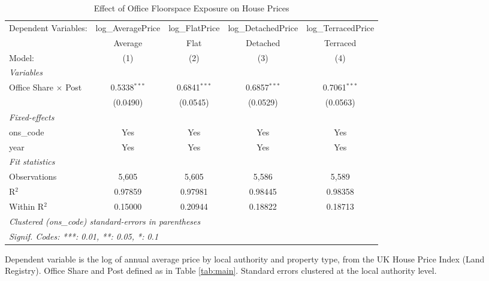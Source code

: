 
\begin{table}[htbp]
   \caption{\label{tab:prices} Effect of Office Floorspace Exposure on House Prices}
   \centering
   \footnotesize\begin{tabular}{lcccc}
      \tabularnewline \midrule \midrule
      Dependent Variables:        & log\_AveragePrice  & log\_FlatPrice  & log\_DetachedPrice  & log\_TerracedPrice\\   
                                  & Average            & Flat            & Detached            & Terraced \\   
      Model:                      & (1)                & (2)             & (3)                 & (4)\\  
      \midrule
      \emph{Variables}\\
      Office Share $\times$ Post  & 0.5338$^{***}$     & 0.6841$^{***}$  & 0.6857$^{***}$      & 0.7061$^{***}$\\   
                                  & (0.0490)           & (0.0545)        & (0.0529)            & (0.0563)\\   
      \midrule
      \emph{Fixed-effects}\\
      ons\_code                   & Yes                & Yes             & Yes                 & Yes\\  
      year                        & Yes                & Yes             & Yes                 & Yes\\  
      \midrule
      \emph{Fit statistics}\\
      Observations                & 5,605              & 5,605           & 5,586               & 5,589\\  
      R$^2$                       & 0.97859            & 0.97981         & 0.98445             & 0.98358\\  
      Within R$^2$                & 0.15000            & 0.20944         & 0.18822             & 0.18713\\  
      \midrule \midrule
      \multicolumn{5}{l}{\emph{Clustered (ons\_code) standard-errors in parentheses}}\\
      \multicolumn{5}{l}{\emph{Signif. Codes: ***: 0.01, **: 0.05, *: 0.1}}\\
   \end{tabular}
   
   \par \raggedright 
   Dependent variable is the log of annual average price by local authority and property type, from the UK House Price Index (Land Registry). Office Share and Post defined as in Table \ref{tab:main}. Standard errors clustered at the local authority level.
\end{table}


